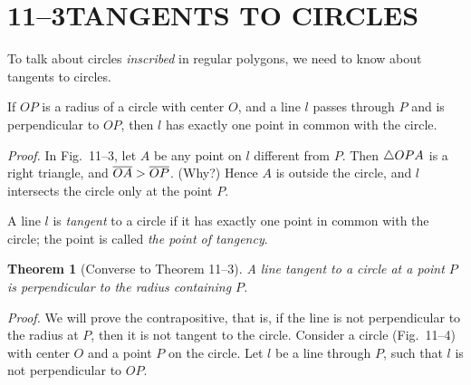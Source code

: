 \documentclass[11pt]{book}
\theoremstyle{XIplainnote}
\newtheorem{XIthmnote}[theorem]{Theorem}
\theoremstyle{bkplain}
\begin{document}
\section*{11--3\quad TANGENTS TO CIRCLES}

To talk about circles \emph{inscribed} in regular polygons, we need to know
about tangents to circles.

\begin{theorem}
If $OP$ is a radius of a circle with center $O$, and a line $l$ passes through
$P$ and is perpendicular to $OP$, then $l$ has exactly one point in common with
the circle.
\end{theorem}

\noindent\emph{Proof.} In Fig.~11--3, let $A$ be any point on $l$ different
from $P$. Then $\triangle OPA$ is a right triangle, and $\overline{OA} > \overline{OP}$.
(Why?) Hence $A$ is outside the circle, and $l$ intersects the circle only at
the point $P$.

\begin{definition}
A line $l$ is \emph{tangent} to a circle if it has exactly one point in common
with the circle; the point is called \emph{the point of tangency}.
\end{definition}

\FIGXITHREEFOUR

\begin{XIthmnote}[Converse to Theorem 11--3]
A line tangent to a circle at a point $P$ is perpendicular to the radius
containing $P$.
\end{XIthmnote}

\noindent\emph{Proof.} We will prove the contrapositive, that is, if the line
is not perpendicular to the radius at $P$, then it is not tangent to the
circle. Consider a circle (Fig.~11--4) with center $O$ and a point $P$ on the
circle. Let $l$ be a line through $P$, such that $l$ is not perpendicular to
$OP$.

\begin{steps}
\end{steps}
\end{document}
